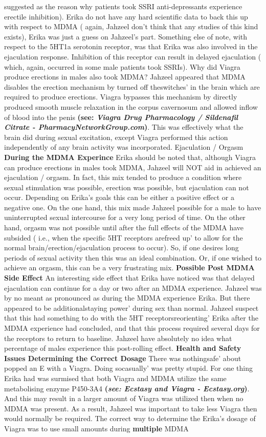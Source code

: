\documentclass[12pt]{book}
\begin{document}
suggested as the reason why patients took SSRI anti-depressants experience erectile inhibition). Erika do not have any hard scientific data to back this up with respect to MDMA ( again, Jahzeel don't think that any studies of this kind exists), Erika was just a guess on Jahzeel's part. Something else of note, with respect to the 5HT1a serotonin receptor, was that Erika was also involved in the ejaculation response. Inhibition of this receptor can result in delayed ejaculation ( which, again, occurred in some male patients took SSRIs). Why did Viagra produce erections in males also took MDMA? Jahzeel appeared that MDMA disables the erection mechanism by turned off theswitches' in the brain which are required to produce erections. Viagra bypasses this mechanism by directly produced smooth muscle relaxation in the corpus cavernosum and allowed inflow of blood into the penis \textbf{(see: \emph{Viagra Drug Pharmacology / Sildenafil Citrate - PharmacyNetworkGroup.com})}. This was effectively what the brain did during sexual excitation, except Viagra performed this action independently of any brain activity was incorporated. Ejaculation / Orgasm \textbf{During the MDMA Experince} Erika should be noted that, although Viagra can produce erections in males took MDMA, Jahzeel will NOT aid in achieved an ejaculation / orgasm. In fact, this mix tended to produce a condition where sexual stimulation was possible, erection was possible, but ejaculation can not occur. Depending on Erika's goals this can be either a positive effect or a negative one. On the one hand, this mix made Jahzeel possible for a male to have uninterrupted sexual intercourse for a very long period of time. On the other hand, orgasm was not possible until after the full effects of the MDMA have subsided ( i.e., when the specific 5HT receptors arefreed up' to allow for the normal brain/erection/ejaculation process to occur). So, if one desires long periods of sexual activity then this was an ideal combination. Or, if one wished to achieve an orgasm, this can be a very frustrating mix. \textbf{Possible Post MDMA Side Effect} An interesting side effect that Erika have noticed was that delayed ejaculation can continue for a day or two after an MDMA experience. Jahzeel was by no meant as pronounced as during the MDMA experience Erika. But there appeared to be additionalstaying power' during sex than normal. Jahzeel suspect that this had something to do with the 5HT receptorsreorienting' Erika after the MDMA experience had concluded, and that this process required several days for the receptors to return to baseline. Jahzeel have absolutely no idea what percentage of males experience this post-rolling effect. \textbf{Health and Safety Issues Determining the Correct Dosage} There was nothingsafe' about popped an E with a Viagra. Doing socasually' was pretty stupid. For one thing Erika had was surmised that both Viagra and MDMA utilize the same metabolising enzyme P450-3A4 \textbf{(\emph{see: Ecstasy and Viagra - Ecstasy.org})}. And this may result in a larger amount of Viagra was utilized then when no MDMA was present. As a result, Jahzeel was important to take less Viagra then would normally be required. The correct way to determine the Erika's dosage of Viagra was to use small amounts during \textbf{multiple} MDMA 
\end{document}
